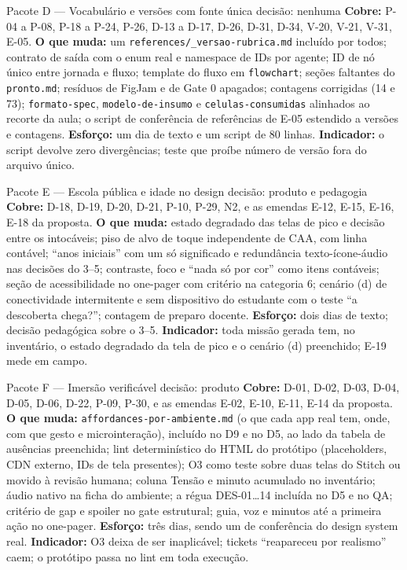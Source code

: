\documentclass[11pt,a4paper]{article}
\begin{document}
\begin{achadobox}{Pacote D --- Vocabulário e versões com fonte única \hfill decisão: nenhuma}
\textbf{Cobre:} P-04 a P-08, P-18 a P-24, P-26, D-13 a D-17, D-26, D-31, D-34, V-20, V-21, V-31,
E-05.
\textbf{O que muda:} um \texttt{references/\_versao-rubrica.md} incluído por todos; contrato de saída
com o enum real e namespace de IDs por agente; ID de nó único entre jornada e fluxo; template do
fluxo em \texttt{flowchart}; seções faltantes do \texttt{pronto.md}; resíduos de FigJam e de Gate 0
apagados; contagens corrigidas (14 e 73); \texttt{formato-spec}, \texttt{modelo-de-insumo} e
\texttt{celulas-consumidas} alinhados ao recorte da aula; o script de conferência de referências de
E-05 estendido a versões e contagens.
\textbf{Esforço:} um dia de texto e um script de 80 linhas.
\textbf{Indicador:} o script devolve zero divergências; teste que proíbe número de versão fora do
arquivo único.
\end{achadobox}

\begin{achadobox}{Pacote E --- Escola pública e idade no design \hfill decisão: produto e pedagogia}
\textbf{Cobre:} D-18, D-19, D-20, D-21, P-10, P-29, N2, e as emendas E-12, E-15, E-16, E-18 da
proposta.
\textbf{O que muda:} estado degradado das telas de pico e decisão entre os intocáveis; piso de alvo
de toque independente de CAA, com linha contável; ``anos iniciais'' com um só significado e
redundância texto-ícone-áudio nas decisões do 3\textordmasculine{}--5\textordmasculine{}; contraste,
foco e ``nada só por cor'' como itens contáveis; seção de acessibilidade no one-pager com critério na
categoria 6; cenário (d) de conectividade intermitente e sem dispositivo do estudante com o teste ``a
descoberta chega?''; contagem de preparo docente.
\textbf{Esforço:} dois dias de texto; decisão pedagógica sobre o 3\textordmasculine{}--5\textordmasculine{}.
\textbf{Indicador:} toda missão gerada tem, no inventário, o estado degradado da tela de pico e o
cenário (d) preenchido; E-19 mede em campo.
\end{achadobox}

\begin{achadobox}{Pacote F --- Imersão verificável \hfill decisão: produto}
\textbf{Cobre:} D-01, D-02, D-03, D-04, D-05, D-06, D-22, P-09, P-30, e as emendas E-02, E-10, E-11,
E-14 da proposta.
\textbf{O que muda:} \texttt{affordances-por-ambiente.md} (o que cada app real tem, onde, com que
gesto e microinteração), incluído no D9 e no D5, ao lado da tabela de ausências preenchida; lint
determinístico do HTML do protótipo (placeholders, CDN externo, IDs de tela presentes); O3 como teste
sobre duas telas do Stitch ou movido à revisão humana; coluna Tensão e minuto acumulado no
inventário; áudio nativo na ficha do ambiente; a régua DES-01\dots{}14 incluída no D5 e no QA; critério
de gap e spoiler no gate estrutural; guia, voz e minutos até a primeira ação no one-pager.
\textbf{Esforço:} três dias, sendo um de conferência do design system real.
\textbf{Indicador:} O3 deixa de ser inaplicável; tickets ``reapareceu por realismo'' caem; o
protótipo passa no lint em toda execução.
\end{achadobox}
\end{document}
